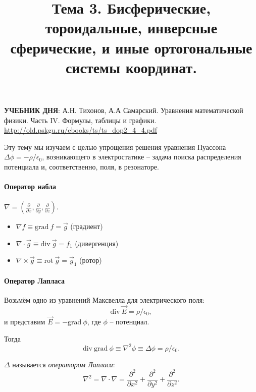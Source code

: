 \documentclass[12pt]{report}
\title{Тема 3. Бисферические, тороидальные, инверсные сферические, и иные ортогональные системы координат.}
\renewcommand{\div}{\mathrm{div~}}
\newcommand{\grad}{\mathrm{grad~}}
\newcommand{\rot}{\mathrm{rot~}}
\begin{document}
	\maketitle
	
\begin{tcolorbox}
	\textbf{УЧЕБНИК ДНЯ}:
	А.Н. Тихонов, А.А Самарский. Уравнения математической физики.
	Часть IV. Формулы, таблицы и графики.
	\url{http://old.pskgu.ru/ebooks/ts/ts_dop2_4_4.pdf}
\end{tcolorbox}
	
Эту тему мы изучаем с целью упрощения решения уравнения Пуассона $\Delta\phi = -\rho/\epsilon_0$, возникающего в электростатике -- задача поиска распределения потенциала и, соответственно, поля, в резонаторе.

\paragraph{Оператор набла} $\nabla = (\frac{\partial}{\partial x}, \frac{\partial}{\partial y}, \frac{\partial}{\partial z})$.
\begin{itemize}
	\item $\nabla f \equiv \grad f = \vec g$ (градиент)
	\item $\nabla\cdot\vec g \equiv \div\vec g = f_1$ (дивергенция)
	\item $\nabla\times\vec g \equiv \rot\vec g = \vec g_1$ (ротор)
\end{itemize}

\paragraph{Оператор Лапласа}
Возьмём одно из уравнений Максвелла для электрического поля:
\[
\div \vec E = \rho/\epsilon_0,
\]
и представим $\vec E = -\grad \phi$, где $\phi$ -- потенциал.

Тогда
\[
\div\grad\phi \equiv \nabla^2 \phi \equiv \Delta\phi = \rho/\epsilon_0.
\]

$\Delta$ называется \emph{оператором Лапласа}:
\[
\nabla^2 = \nabla\cdot\nabla = \frac{\partial^2}{\partial x^2} + \frac{\partial^2}{\partial y^2} + \frac{\partial^2}{\partial z^2}.
\]
\end{document}
